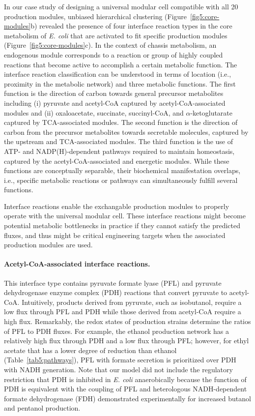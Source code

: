 In our case study of designing a universal modular cell compatible with all 20 production modules, unbiased hierarchical clustering (Figure~\ref{fig5:core-modules}b) revealed the presence of four interface reaction types in the core metabolism of \textit{E. coli} that are activated to fit specific production modules (Figure~\ref{fig5:core-modules}c).
In the context of chassis metabolism, an endogenous module corresponds to a reaction or group of highly coupled reactions that become active to accomplish a certain metabolic function.
The interface reaction classification can be understood in terms of location (i.e., proximity in the metabolic network) and three metabolic functions. The first function is the direction of carbon towards general precursor metabolites including (i) pyruvate and acetyl-CoA captured by acetyl-CoA-associated modules and (ii) oxaloacetate, succinate, succinyl-CoA, and $\alpha$-ketoglutarate captured by TCA-associated modules. The second function is the direction of carbon from the precursor metabolites towards secretable molecules, captured by the upstream and TCA-associated modules. The third function is the use of ATP- and NADP(H)-dependent pathways required to maintain homeostasis, captured by the acetyl-CoA-associated and energetic modules. While these functions are conceptually separable, their biochemical manifestation overlaps, i.e., specific metabolic reactions or pathways can simultaneously fulfill several functions.

Interface reactions enable the exchangable production modules to properly operate with the universal modular cell.
These interface reactions might become potential metabolic bottlenecks in practice if they cannot satisfy the predicted fluxes, and thus might be critical engineering targets when the associated production modules are used.


\paragraph{Acetyl-CoA-associated interface reactions.}
This interface type contains pyruvate formate lyase (PFL) and pyruvate dehydrogenase enzyme complex (PDH) reactions that convert pyruvate to acetyl-CoA.
Intuitively, products derived from pyruvate, such as isobutanol, require a low flux through PFL and PDH while those derived from acetyl-CoA require a high flux.
Remarkably, the redox states of production strains determine the ratios of PFL to PDH  fluxes.
For example, the ethanol production network has a relatively high flux through PDH and a low flux through PFL; however, for ethyl acetate that has a lower degree of reduction than ethanol (Table~\ref{tab5:pathways}), PFL with formate secretion is prioritized over PDH with NADH  generation.
Note that our model did not include the regulatory restriction that PDH is inhibited in \textit{E. coli} anaerobically because the function of PDH is equivalent with the coupling of PFL and heterologous NADH-dependent formate dehydrogenase (FDH) demonstrated experimentally for increased butanol\citep{shen2011, nielsen2009} and pentanol\citep{tseng2012} production.

